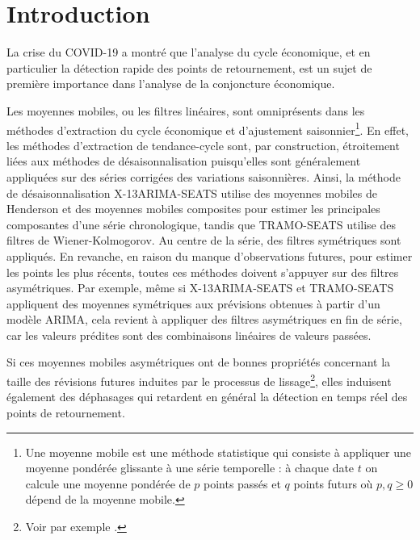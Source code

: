 \documentclass[
  11pt,
  french,
  a4paper]{article}
\newcommand\1{\mathds{1}}
\begin{document}
\newpage

\hypertarget{introduction}{%
\section*{Introduction}\label{introduction}}

La crise du COVID-19 a montré que l'analyse du cycle économique, et en particulier la détection rapide des points de retournement, est un sujet de première importance dans l'analyse de la conjoncture économique.

Les moyennes mobiles, ou les filtres linéaires, sont omniprésents dans les méthodes d'extraction du cycle économique et d'ajustement saisonnier\footnote{
  Une moyenne mobile est une méthode statistique qui consiste à appliquer une moyenne pondérée glissante à une série temporelle : à chaque date \(t\) on calcule une moyenne pondérée de \(p\) points passés et \(q\) points futurs où \(p,q\geq0\) dépend de la moyenne mobile.}.
En effet, les méthodes d'extraction de tendance-cycle sont, par construction, étroitement liées aux méthodes de désaisonnalisation puisqu'elles sont généralement appliquées sur des séries corrigées des variations saisonnières.
Ainsi, la méthode de désaisonnalisation X-13ARIMA-SEATS utilise des moyennes mobiles de Henderson et des moyennes mobiles composites pour estimer les principales composantes d'une série chronologique, tandis que TRAMO-SEATS utilise des filtres de Wiener-Kolmogorov.
Au centre de la série, des filtres symétriques sont appliqués.
En revanche, en raison du manque d'observations futures, pour estimer les points les plus récents, toutes ces méthodes doivent s'appuyer sur des filtres asymétriques.
Par exemple, même si X-13ARIMA-SEATS et TRAMO-SEATS appliquent des moyennes symétriques aux prévisions obtenues à partir d'un modèle ARIMA, cela revient à appliquer des filtres asymétriques en fin de série, car les valeurs prédites sont des combinaisons linéaires de valeurs passées.

Si ces moyennes mobiles asymétriques ont de bonnes propriétés concernant la taille des révisions futures induites par le processus de lissage\footnote{Voir par exemple \textcite{pierce1980SA}.}, elles induisent également des déphasages qui retardent en général la détection en temps réel des points de retournement.
\end{document}
